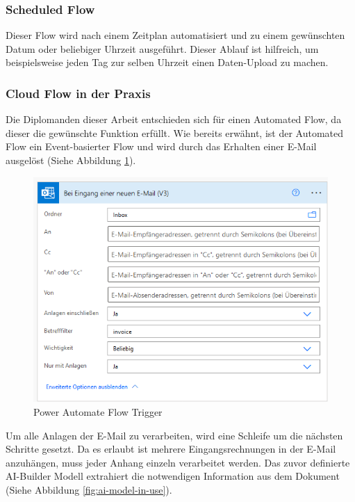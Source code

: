 \subsubsection{Scheduled Flow}
Dieser Flow wird nach einem Zeitplan automatisiert und zu einem gewünschten Datum oder beliebiger Uhrzeit ausgeführt. Dieser Ablauf ist hilfreich, um beispielsweise jeden Tag zur selben Uhrzeit einen Daten-Upload zu machen.

\subsubsection{Cloud Flow in der Praxis}
Die Diplomanden dieser Arbeit entschieden sich für einen Automated Flow, da dieser die gewünschte Funktion erfüllt. Wie bereits erwähnt, ist der Automated Flow ein Event-basierter Flow und wird durch das Erhalten einer E-Mail ausgelöst (Siehe Abbildung \ref{fig:flow-trigger}).

\begin{figure}[h]
    \centering
    \includegraphics[scale=0.9]{sections/cloud-computing/images/power-automate-flow/trigger.png}
    \caption{Power Automate Flow Trigger}
    \label{fig:flow-trigger}
\end{figure}

Um alle Anlagen der E-Mail zu verarbeiten, wird eine Schleife um die nächsten Schritte gesetzt. Da es erlaubt ist mehrere Eingangsrechnungen in der E-Mail anzuhängen, muss jeder Anhang einzeln verarbeitet werden. Das zuvor definierte AI-Builder Modell extrahiert die notwendigen Information aus dem Dokument (Siehe Abbildung \ref{fig:ai-model-in-use}).

